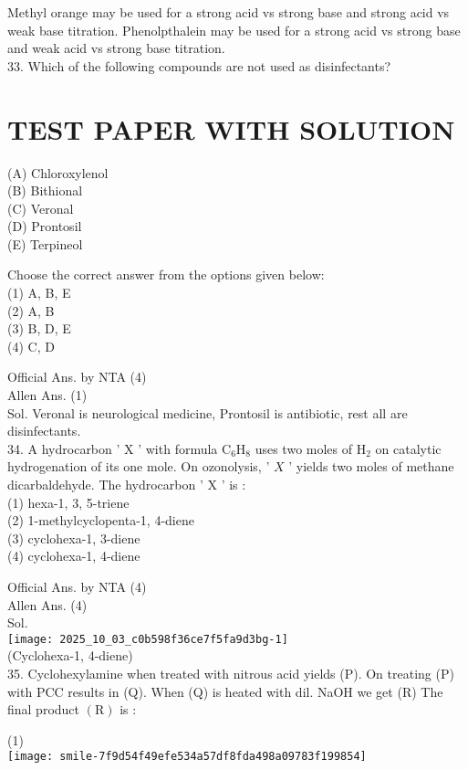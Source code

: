 \documentclass[10pt]{article}
\begin{document}
Methyl orange may be used for a strong acid vs strong base and strong acid vs weak base titration. Phenolpthalein may be used for a strong acid vs strong base and weak acid vs strong base titration.\\
33. Which of the following compounds are not used as disinfectants?

\section*{TEST PAPER WITH SOLUTION}
(A) Chloroxylenol\\
(B) Bithional\\
(C) Veronal\\
(D) Prontosil\\
(E) Terpineol

Choose the correct answer from the options given below:\\
(1) A, B, E\\
(2) A, B\\
(3) B, D, E\\
(4) C, D

Official Ans. by NTA (4)\\
Allen Ans. (1)\\
Sol. Veronal is neurological medicine, Prontosil is antibiotic, rest all are disinfectants.\\
34. A hydrocarbon ' X ' with formula \(\mathrm{C}_{6} \mathrm{H}_{8}\) uses two moles of \(\mathrm{H}_{2}\) on catalytic hydrogenation of its one mole. On ozonolysis, ' \(X\) ' yields two moles of methane dicarbaldehyde. The hydrocarbon ' X ' is :\\
(1) hexa-1, 3, 5-triene\\
(2) 1-methylcyclopenta-1, 4-diene\\
(3) cyclohexa-1, 3-diene\\
(4) cyclohexa-1, 4-diene

Official Ans. by NTA (4)\\
Allen Ans. (4)\\
Sol.\\
\texttt{[image: 2025\_10\_03\_c0b598f36ce7f5fa9d3bg-1]}\\
(Cyclohexa-1, 4-diene)\\
35. Cyclohexylamine when treated with nitrous acid yields (P). On treating (P) with PCC results in (Q). When (Q) is heated with dil. NaOH we get (R) The final product \((\mathrm{R})\) is :

(1)\\
\texttt{[image: smile-7f9d54f49efe534a57df8fda498a09783f199854]}
\end{document}
